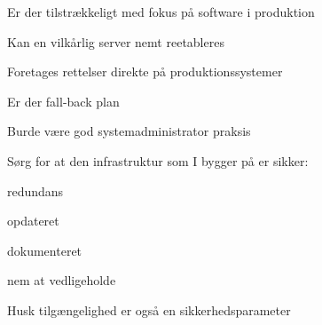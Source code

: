 \documentclass[Screen16to9,17pt]{foils}
\begin{document}

\begin{list1}
\item Er der tilstrækkeligt med fokus på software i produktion
\item Kan en vilkårlig server nemt reetableres
\item Foretages rettelser direkte på produktionssystemer
\item Er der fall-back plan
\item Burde være god systemadministrator praksis
\end{list1}




\begin{list1}
\item Sørg for at den infrastruktur som I bygger på er sikker:
\begin{list2}
 \item redundans
       \item opdateret
        \item dokumenteret
        \item nem at vedligeholde
\end{list2}

\item  Husk tilgængelighed er også en sikkerhedsparameter
\end{list1}


\slidenext
\end{document}
